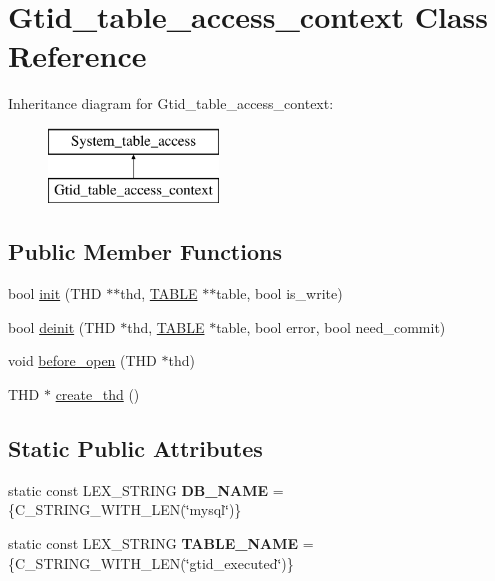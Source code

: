 \hypertarget{classGtid__table__access__context}{}\section{Gtid\+\_\+table\+\_\+access\+\_\+context Class Reference}
\label{classGtid__table__access__context}
Inheritance diagram for Gtid\+\_\+table\+\_\+access\+\_\+context\+:\begin{figure}[H]
\begin{center}
\leavevmode
\includegraphics[height=2.000000cm]{classGtid__table__access__context}
\end{center}
\end{figure}
\subsection*{Public Member Functions}
\begin{DoxyCompactItemize}
\item 
bool \mbox{\hyperlink{classGtid__table__access__context_a9786483f2f9e63d06307c9261db6aa91}{init}} (T\+HD $\ast$$\ast$thd, \mbox{\hyperlink{structTABLE}{T\+A\+B\+LE}} $\ast$$\ast$table, bool is\+\_\+write)
\item 
bool \mbox{\hyperlink{classGtid__table__access__context_a07f00187a61eaad20592022fb51bac02}{deinit}} (T\+HD $\ast$thd, \mbox{\hyperlink{structTABLE}{T\+A\+B\+LE}} $\ast$table, bool error, bool need\+\_\+commit)
\item 
void \mbox{\hyperlink{classGtid__table__access__context_a2073456f19b6b9aa81cb7d874c4f2358}{before\+\_\+open}} (T\+HD $\ast$thd)
\item 
T\+HD $\ast$ \mbox{\hyperlink{classGtid__table__access__context_ad61c84d1acef30f8de7620b7f60dfcfd}{create\+\_\+thd}} ()
\end{DoxyCompactItemize}
\subsection*{Static Public Attributes}
\begin{DoxyCompactItemize}
\item 
\mbox{\label{classGtid__table__access__context_ac4b84dbee7ce73d070bcb2f288515cff}} 
static const L\+E\+X\+\_\+\+S\+T\+R\+I\+NG {\bfseries D\+B\+\_\+\+N\+A\+ME} = \{C\+\_\+\+S\+T\+R\+I\+N\+G\+\_\+\+W\+I\+T\+H\+\_\+\+L\+EN(\char`\"{}mysql\char`\"{})\}
\item 
\mbox{\label{classGtid__table__access__context_ac5b8f18525fc6d848c32f58bce567fe5}} 
static const L\+E\+X\+\_\+\+S\+T\+R\+I\+NG {\bfseries T\+A\+B\+L\+E\+\_\+\+N\+A\+ME} = \{C\+\_\+\+S\+T\+R\+I\+N\+G\+\_\+\+W\+I\+T\+H\+\_\+\+L\+EN(\char`\"{}gtid\+\_\+executed\char`\"{})\}
\end{DoxyCompactItemize}
